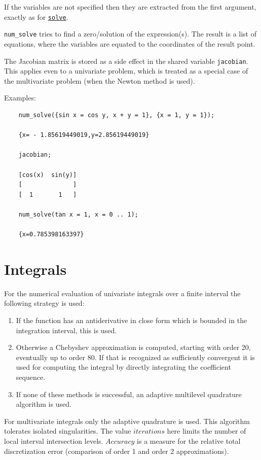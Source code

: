If the variables are not specified then they are extracted from the
first argument, exactly as for
\hyperlink{operator:SOLVE}{\texttt{solve}}.

\texttt{num\_solve} tries to find a zero/solution of the
expression(s).  The result is a list of equations, where the variables
are equated to the coordinates of the result point.

\hypertarget{reserved:JACOBIAN}{}
The Jacobian matrix is stored as a side effect in the shared variable
\texttt{jacobian}.
This applies even to a univariate problem, which is treated as a
special case of the multivariate problem (when the Newton method is
used).

Examples:
\begin{verbatim}
    num_solve({sin x = cos y, x + y = 1}, {x = 1, y = 1});

    {x= - 1.85619449019,y=2.85619449019}

    jacobian;

    [cos(x)  sin(y)]
    [              ]
    [  1       1   ]

    num_solve(tan x = 1, x = 0 .. 1);

    {x=0.785398163397}
\end{verbatim}

\section{Integrals}
\hypertarget{operator:NUM_INT}{}

For the numerical evaluation of univariate integrals over a finite
interval the following strategy is used:
\begin{enumerate}
\item If the function has an antiderivative in close form
    which is bounded in the integration interval, this
    is used.
\item Otherwise a Chebyshev approximation is computed,
    starting with order 20, eventually up to order 80.
    If that is recognized as sufficiently convergent
    it is used for computing the integral by directly
    integrating the coefficient sequence.
\item If none of these methods is successful, an
    adaptive multilevel quadrature algorithm is used.
\end{enumerate}
For multivariate integrals only the adaptive quadrature is used.
This algorithm tolerates isolated singularities.
The value $iterations$ here limits the number of
local interval intersection levels.
$Accuracy$ is a measure for the relative total discretization
error (comparison of order 1 and order 2 approximations).

